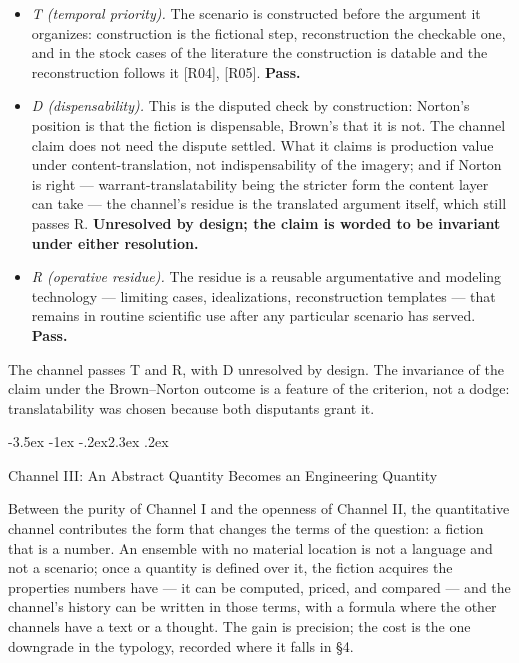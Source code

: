 \documentclass[11pt,a4paper]{article}
\makeatletter
\renewcommand\section{\@startsection{section}{1}{\z@}%
  {-3.5ex \@plus -1ex \@minus -.2ex}{2.3ex \@plus .2ex}%
  {\normalfont\Large\bfseries\raggedright}}
\makeatother
\begin{document}
\begin{itemize}[leftmargin=1.6em,itemsep=2pt,parsep=0pt,topsep=3pt]
\item \textit{T (temporal priority).} The scenario is constructed before the argument it organizes: construction is the fictional step, reconstruction the checkable one, and in the stock cases of the literature the construction is datable and the reconstruction follows it [R04], [R05]. \textbf{Pass.}
\item \textit{D (dispensability).} This is the disputed check by construction: Norton's position is that the fiction is dispensable, Brown's that it is not. The channel claim does not need the dispute settled. What it claims is production value under content-translation, not indispensability of the imagery; and if Norton is right — warrant-translatability being the stricter form the content layer can take — the channel's residue is the translated argument itself, which still passes R. \textbf{Unresolved by design; the claim is worded to be invariant under either resolution.}
\item \textit{R (operative residue).} The residue is a reusable argumentative and modeling technology — limiting cases, idealizations, reconstruction templates — that remains in routine scientific use after any particular scenario has served. \textbf{Pass.}
\end{itemize}

The channel passes T and R, with D unresolved by design. The invariance of the claim under the Brown–Norton outcome is a feature of the criterion, not a dodge: translatability was chosen because both disputants grant it.

\section{Channel III: An Abstract Quantity Becomes an Engineering Quantity}

Between the purity of Channel I and the openness of Channel II, the quantitative channel contributes the form that changes the terms of the question: a fiction that is a number. An ensemble with no material location is not a language and not a scenario; once a quantity is defined over it, the fiction acquires the properties numbers have --- it can be computed, priced, and compared --- and the channel's history can be written in those terms, with a formula where the other channels have a text or a thought. The gain is precision; the cost is the one downgrade in the typology, recorded where it falls in \S4.
\end{document}
